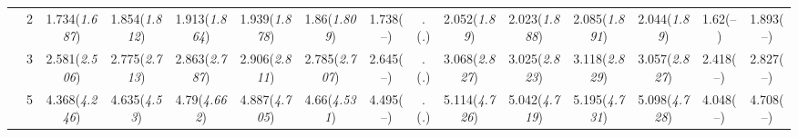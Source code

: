 \documentclass{article}
\begin{document}
\begin{table}[tbp]
{\begin{tabularx}{\textwidth}{lCCCCCCCCCCCCCC}
&2&1.734\newline (\emph{1.687})&1.854\newline (\emph{1.812})&1.913\newline (\emph{1.864})&1.939\newline (\emph{1.878})&1.86\newline (\emph{1.809})&1.738\newline (--)&.\newline (\emph{.})&2.052\newline (\emph{1.89})&2.023\newline (\emph{1.888})&2.085\newline (\emph{1.891})&2.044\newline (\emph{1.89})&1.62\newline (--)&1.893\newline (--) \tabularnewline
&3&2.581\newline (\emph{2.506})&2.775\newline (\emph{2.713})&2.863\newline (\emph{2.787})&2.906\newline (\emph{2.811})&2.785\newline (\emph{2.707})&2.645\newline (--)&.\newline (\emph{.})&3.068\newline (\emph{2.827})&3.025\newline (\emph{2.823})&3.118\newline (\emph{2.829})&3.057\newline (\emph{2.827})&2.418\newline (--)&2.827\newline (--) \tabularnewline
&5&4.368\newline (\emph{4.246})&4.635\newline (\emph{4.53})&4.79\newline (\emph{4.662})&4.887\newline (\emph{4.705})&4.66\newline (\emph{4.531})&4.495\newline (--)&.\newline (\emph{.})&5.114\newline (\emph{4.726})&5.042\newline (\emph{4.719})&5.195\newline (\emph{4.731})&5.098\newline (\emph{4.728})&4.048\newline (--)&4.708\newline (--) \tabularnewline

\end{tabularx}}
\end{table}
\end{document}
